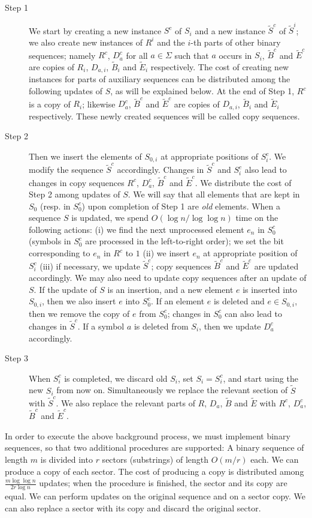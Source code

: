 \documentclass[11pt]{article}\usepackage{fullpage}
\newcommand{\tS}{{\tilde S}}
\newcommand{\tB}{{\tilde B}}
\newcommand{\tE}{{\tilde E}}
\begin{document}
\begin{description}
\item[Step 1]
We start by creating a new instance $S^c$ of $S_i$ and a new instance $\tS^c$ of $\tS^i$; we also create new instances of 
$R^i$ and the $i$-th parts of other binary sequences; namely $R^c$, $D^c_a$ for all $a\in \Sigma$ such that $a$ occurs in $S_i$, $\tB^c$ and $\tE^c$ are copies of $R_i$, $D_{a,i}$, $\tB_i$ and $\tE_i$ respectively. The cost of creating new instances for parts of auxiliary sequences can be distributed 
among the following updates of $S$, as will be explained below. At the end of Step 1, $R^c$ is a copy of $R_i$; likewise  $D^c_a$, $\tB^c$ and $\tE^c$ are copies of  $D_{a,i}$, $\tB_i$ and $\tE_i$ respectively. These newly created sequences will be called copy sequences.\\
\item[Step 2]
Then we insert the elements of $S_{0,i}$ at appropriate positions of $S^c_i$.  
We  modify the sequence $\tS^c$  accordingly. 
Changes in $\tS^c$ and $S_i^c$ also lead to changes in copy sequences $R^c$,  $D^c_a$, $\tB^c$ and $\tE^c$. We distribute the cost of Step 2 among  updates of $S$.  We will say that all  elements that are kept in $S_0$ (resp. in $S^c_0$) upon completion of Step 1  are \emph{old} elements.
 When a sequence $S$ is updated, we spend $O(\log n/\log \log n)$ time on the following actions: (i) we find the next unprocessed element $e_n$ in $S_0^c$ (symbols in $S^c_0$ are processed in the left-to-right order);  we set the bit corresponding to $e_n$ in $R^c$ to $1$ (ii) we insert $e_n$ at appropriate position of    $S_i^c$ (iii) if necessary, we update $\tS^c$; copy sequences $\tB^c$ and $\tE^c$ are updated accordingly.
We may also need to  update copy sequences after an update of $S$. 
If the update of $S$ is an insertion, and a new element $e$ is inserted into $S_{0,i}$, then we also insert $e$ into $S_0^c$. If an element $e$ is deleted and $e\in S_{0,i}$, then we remove the copy of $e$ from $S^c_0$; changes in $S_0^c$ can also lead to changes in $\tS^c$.  If a symbol $a$ is deleted from $S_i$, then we update $D^c_a$  accordingly. 
\item[Step 3]
When $S_i^c$ is completed, we discard old $S_i$, set $S_i=S^c_i$, and start using the new $S_i$ from now on. Simultaneously we replace the relevant section of 
$\tS$ with $\tS^c$. We also replace the relevant parts of $R$,  $D_a$,  $\tB$ and $\tE$ with $R^c$, $D^c_a$,  $\tB^c$ and $\tE^c$.
\end{description}
In order to execute the above background process, we must implement binary sequences, so that two additional procedures are supported: A binary sequence of length $m$ is divided into $r$ sectors (substrings) of length $O(m/r)$ each. We can produce a copy of each sector. The cost of producing a copy is distributed among $\frac{m\log\log n}{2r \log n}$ updates; when the procedure is finished, the sector and its copy are equal. We can perform updates on the original sequence and on a sector copy. We can also replace a sector with its copy and discard the original sector. 
\end{document}
